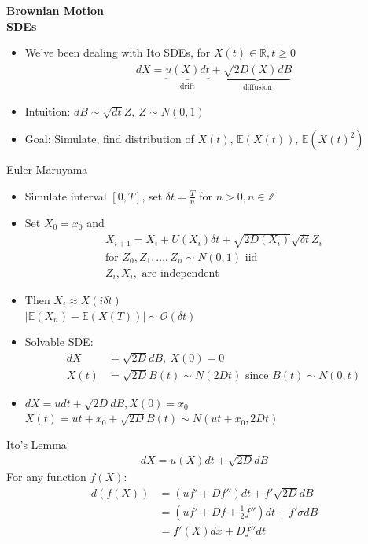 \documentclass[12pt, letterpaper]{article}
\begin{document}
 
\textbf{Brownian Motion} \\
\textbf{SDEs}
\begin{itemize}
    \item We've been dealing with Ito SDEs, for $X(t) \in \mathbb{R},t \ge 0$
    \begin{align*}
        dX = \underbrace{u(X)dt}_{\text{drift}} + \underbrace{\sqrt{2D(X)}dB}_{\text{diffusion}}
    \end{align*}
    \item Intuition: $dB \sim \sqrt{dt}Z,\ Z\sim N(0,1)$
    \item Goal: Simulate, find distribution of $X(t)$, $\mathbb{E}(X(t))$, $\mathbb{E}(X(t)^2)$
\end{itemize}
\underline{Euler-Maruyama}
\begin{itemize}
    \item Simulate interval $[0,T]$, set $\delta t = \frac Tn$ for $n > 0, n \in \mathbb{Z}$
    \item Set $X_0 = x_0$ and 
    \begin{align*}
        X_{i+1} = X_i + U(X_i)\delta t + \sqrt{2D(X_i)}\sqrt{\delta t} Z_i \\
        \text{for } Z_0, Z_1, \dots, Z_n \sim N(0,1) \text{ iid} \\
        Z_i, X_i, \text{ are independent}
    \end{align*}
    \item Then $X_i \approx X(i\delta t)$ \\
    $|\mathbb{E}(X_n) - \mathbb{E}(X(T))| \sim \mathcal{O}(\delta t)$
    \item Solvable SDE:
    \begin{align*}
        dX &= \sqrt{2D} dB,\ X(0) = 0 \\
        X(t) &= \sqrt{2D}B(t) \sim N(2Dt) \text{ since }B(t) \sim N(0,t)
    \end{align*}
    \item $dX = udt + \sqrt{2D}dB, X(0) = x_0$ \\
    $X(t) = ut + x_0 +\sqrt{2D}B(t) \sim N(ut+ x_0,2Dt)$ 
\end{itemize}
\underline{Ito's Lemma}
\begin{align*}
    dX = u(X)dt + \sqrt{2D}dB
\end{align*}
For any function $f(X)$:
\begin{align*}
    d(f(X)) &= (uf' + Df'')dt + f'\sqrt{2D} dB \\
    &= (uf' + Df + \frac 12 f'')dt + f' \sigma dB \\
    &= f'(X)dx + Df''dt
\end{align*}
\end{document}
